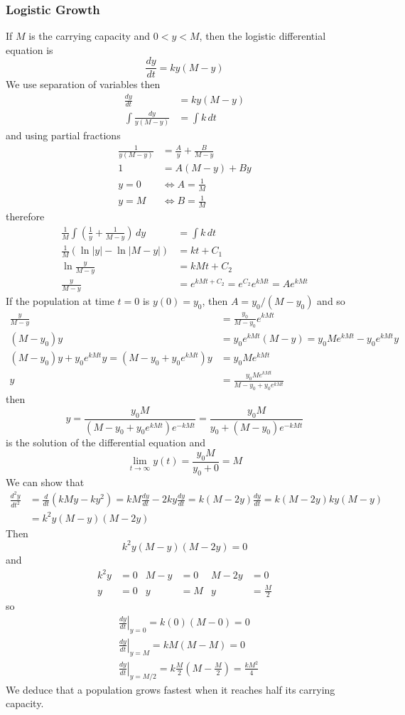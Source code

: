 \subsubsection{Logistic Growth}
If \(M\) is the carrying capacity and \(0<y<M\), then the logistic
differential equation is
\[\frac{dy}{dt}=ky(M-y)\]
We use separation of variables then
\begin{align*}
    \frac{dy}{dt} &= ky(M-y) \\
    \int\frac{dy}{y(M-y)} &= \int k\,dt
\end{align*}
and using partial fractions
\begin{align*}
    \frac{1}{y(M-y)} &= \frac{A}{y}+\frac{B}{M-y} \\
    1 &= A(M-y)+By \\
    y=0 &\iff A=\frac{1}{M} \\
    y=M &\iff B=\frac{1}{M}
\end{align*}
therefore
\begin{align*}
    \frac{1}{M}\int\left(\frac{1}{y}+\frac{1}{M-y}\right)\,dy &= \int k\,dt \\
    \frac{1}{M}(\ln|y|-\ln|M-y|) &= kt+C_1 \\
    \ln\frac{y}{M-y} &= kMt+C_2 \\
    \frac{y}{M-y} &= e^{kMt+C_2}=e^{C_2}e^{kMt}=Ae^{kMt}
\end{align*}
If the population at time \(t=0\) is \(y(0)=y_0\),
then \(A=y_0/(M-y_0)\) and so
\begin{align*}
    \frac{y}{M-y} &= \frac{y_0}{M-y_0}e^{kMt} \\
    (M-y_0)y &= y_0e^{kMt}(M-y)=y_0Me^{kMt}-y_0e^{kMt}y \\
    (M-y_0)y+y_0e^{kMt}y=(M-y_0+y_0e^{kMt})y &= y_0Me^{kMt} \\
    y &= \frac{y_0Me^{kMt}}{M-y_0+y_0e^{kMt}}
\end{align*}
then
\[y=\frac{y_0M}{(M-y_0+y_0e^{kMt})e^{-kMt}}=\frac{y_0M}{y_0+(M-y_0)e^{-kMt}}\]
is the solution of the differential equation and
\[\lim_{t\to\infty}y(t)=\frac{y_0M}{y_0+0}=M\]
We can show that
\begin{align*}
    \frac{d^2y}{dt^2} &= \frac{d}{dt}(kMy-ky^2)=kM\frac{dy}{dt}-2ky\frac{dy}{dt}
    =k(M-2y)\frac{dy}{dt}=k(M-2y)ky(M-y) \\
    &= k^2y(M-y)(M-2y)
\end{align*}
Then
\[k^2y(M-y)(M-2y)=0\]
and
\begin{align*}
    k^2y &= 0 & M-y &= 0 & M-2y &= 0 \\
    y &= 0 & y &= M & y &= \frac{M}{2}
\end{align*}
so
\begin{align*}
    &\left.\frac{dy}{dt}\right|_{y=0}=k(0)(M-0)=0 \\
    &\left.\frac{dy}{dt}\right|_{y=M}=kM(M-M)=0 \\
    &\left.\frac{dy}{dt}\right|_{y=M/2}=k\frac{M}{2}\left(M-\frac{M}{2}\right)
    =\frac{kM^2}{4}
\end{align*}
We deduce that a population grows fastest when it reaches half its carrying
capacity.